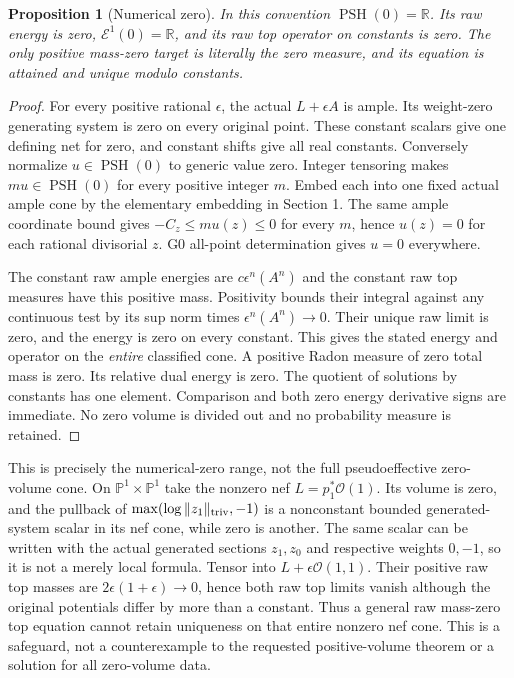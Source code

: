 \documentclass[10pt]{article}
\newtheorem{proposition}[theorem]{Proposition}
\newcommand{\PSH}{\operatorname{PSH}}
\newcommand{\OO}{\mathcal O}
\newcommand{\E}{\mathcal E}
\begin{document}
\begin{proposition}[Numerical zero]
In this convention $\PSH(0)=\mathbb R$. Its raw energy is zero,
$\E^1(0)=\mathbb R$, and its raw top operator on constants is zero.
The only positive mass-zero target is literally the zero measure,
and its equation is attained and unique modulo constants.
\end{proposition}
\begin{proof}
For every positive rational $\epsilon$, the actual $L+\epsilon A$
is ample. Its weight-zero generating system is zero on every original
point. These constant scalars give one defining net for zero, and
constant shifts give all real constants. Conversely normalize
$u\in\PSH(0)$ to generic value zero. Integer tensoring makes
$m u\in\PSH(0)$ for every positive integer $m$. Embed each into
one fixed actual ample cone by the elementary embedding in Section 1.
The same ample coordinate bound gives $-C_z\leq m u(z)\leq0$ for
every $m$, hence $u(z)=0$ for each rational divisorial $z$.
G0 all-point determination gives $u=0$ everywhere.

The constant raw ample energies are $c\epsilon^n(A^n)$ and the
constant raw top measures have this positive mass. Positivity bounds
their integral against any continuous test by its sup norm times
$\epsilon^n(A^n)\to0$. Their unique raw limit is zero, and the
energy is zero on every constant. This gives the stated energy and
operator on the \emph{entire} classified cone. A positive Radon
measure of zero total mass is zero. Its relative dual energy is zero.
The quotient of solutions by constants has one element. Comparison
and both zero energy derivative signs are immediate. No zero volume
is divided out and no probability measure is retained.
\end{proof}

This is precisely the numerical-zero range, not the full pseudoeffective
zero-volume cone. On $\mathbb P^1\times\mathbb P^1$ take the nonzero nef
$L=p_1^*\OO(1)$. Its volume is zero, and the pullback of
$\max(\log\|z_1\|_{\rm triv},-1)$ is a nonconstant bounded generated-system
scalar in its nef cone, while zero is another. The same scalar can be
written with the actual generated sections $z_1,z_0$ and respective
weights $0,-1$, so it is not a merely local formula.
Tensor into $L+\epsilon\OO(1,1)$. Their positive raw top masses are
$2\epsilon(1+\epsilon)\to0$, hence both raw top limits vanish although
the original potentials differ by more than a constant. Thus a general
raw mass-zero top equation cannot retain uniqueness on that entire
nonzero nef cone. This is a safeguard, not a counterexample to the
requested positive-volume theorem or a solution for all zero-volume data.
\end{document}
